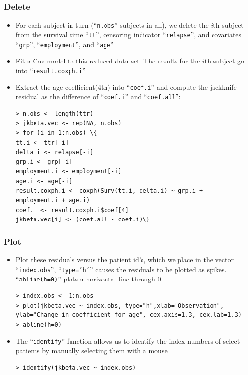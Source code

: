 \documentclass{beamer}
\begin{document}
\pagebreak
\begin{frame}[fragile]
\frametitle{Delete}
\begin{itemize}
\item For each subject in turn (``\texttt{n.obs}'' subjects in all), we delete the $i$th subject from the survival time ``\texttt{tt}'', censoring indicator ``\texttt{relapse}'', and covariates ``\texttt{grp}'', ``\texttt{employment}'', and ``\texttt{age}''
\item Fit a Cox model to this reduced data set. The results for the $i$th subject go into ``\texttt{result.coxph.i}''
\item Extract the age coefficient(4th) into ``\texttt{coef.i}'' and compute the jackknife residual as the difference of ``\texttt{coef.i}'' and ``\texttt{coef.all}'':
\begin{Verbatim}
> n.obs <- length(ttr)
> jkbeta.vec <- rep(NA, n.obs)
> for (i in 1:n.obs) \{
tt.i <- ttr[-i]
delta.i <- relapse[-i]
grp.i <- grp[-i]
employment.i <- employment[-i]
age.i <- age[-i]
result.coxph.i <- coxph(Surv(tt.i, delta.i) ~ grp.i +
employment.i + age.i)
coef.i <- result.coxph.i$coef[4]
jkbeta.vec[i] <- (coef.all - coef.i)\}
\end{Verbatim}
\end{itemize}
\end{frame}

\pagebreak
\begin{frame}[fragile]
\frametitle{Plot}
\begin{itemize}
\item Plot these residuals versus the patient id's, which we place in the vector ``\texttt{index.obs}'', ``\texttt{type='h'}'' causes the residuals to be plotted as spikes. ``\texttt{abline(h=0)}'' plots a horizontal line through 0.
\begin{Verbatim}
> index.obs <- 1:n.obs
> plot(jkbeta.vec ~ index.obs, type="h",xlab="Observation", 
ylab="Change in coefficient for age", cex.axis=1.3, cex.lab=1.3)
> abline(h=0)
\end{Verbatim}
\item The ``\texttt{identify}'' function allows us to identify the index numbers of select patients by manually selecting them with a mouse
\begin{Verbatim}
> identify(jkbeta.vec ~ index.obs)
\end{Verbatim}
\end{itemize}
\end{frame}
\end{document}
